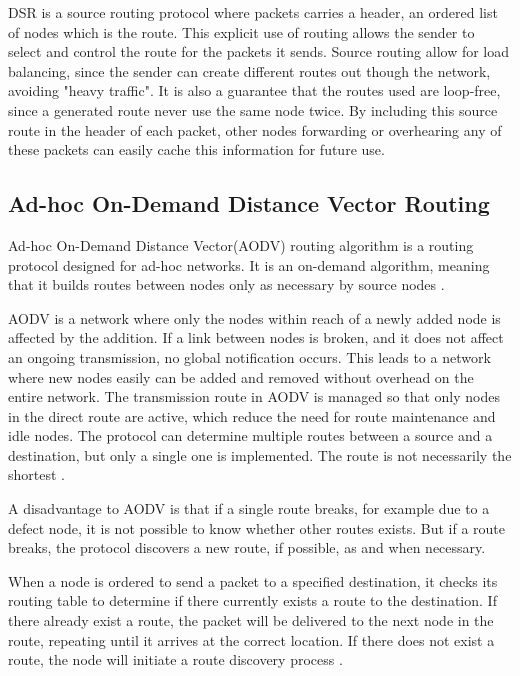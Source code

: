 DSR is a source routing protocol where packets carries a header, an ordered list of nodes which is the route.
This explicit use of routing allows the sender to select and control the route for the packets it sends.
Source routing allow for load balancing, since the sender can create different routes out though the network, avoiding "heavy traffic".
It is also a guarantee that the routes used are loop-free, since a generated route never use the same node twice.
By including this source route in the header of each packet, other nodes forwarding or overhearing any of these packets can easily cache this information for future use\cite{DSR}.

\subsection{Ad-hoc On-Demand Distance Vector Routing}
Ad-hoc On-Demand Distance Vector(AODV) routing algorithm is a routing protocol designed for ad-hoc networks. 
It is an on-demand algorithm, meaning that it builds routes between nodes only as necessary by source nodes \cite{AOVD1}.

AODV is a network where only the nodes within reach of a newly added node is affected by the addition.
If a link between nodes is broken, and it does not affect an ongoing transmission, no global notification occurs.
This leads to a network where new nodes easily can be added and removed without overhead on the entire network.
The transmission route in AODV is managed so that only nodes in the direct route are active, which reduce the need for route maintenance and idle nodes.
The protocol can determine multiple routes between a source and a destination, but only a single one is implemented.
The route is not necessarily the shortest \cite{AOVD1}.

A disadvantage to AODV is that if a single route breaks, for example due to a defect node, it is not possible to know whether other routes exists.
But if a route breaks, the protocol discovers a new route, if possible, as and when necessary.

When a node is ordered to send a packet to a specified destination, it checks its routing table to determine if there currently exists a route to the destination.
If there already exist a route, the packet will be delivered to the next node in the route, repeating until it arrives at the correct location.
If there does not exist a route, the node will initiate a route discovery process \cite{AOVD1}.

